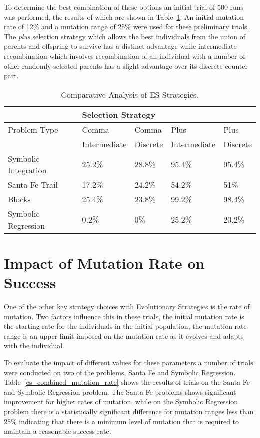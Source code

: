 To determine the best combination of these options an initial trial of 500 runs was performed, the results of which are shown in Table~\ref{es_strategies}. An initial mutation rate of 12\% and a mutation range of 25\% were used for these preliminary trials. The \emph{plus} selection strategy which allows the best individuals from the union of parents and offspring to survive has a distinct advantage while intermediate recombination which involves recombination of an individual with a number of other randomly selected parents has a slight advantage over its discrete counter part. 



\begin{table}[h]
\begin{center}
\begin{tabular}{|l|l|l|l|l|}
\hline
&\multicolumn{4}{|l|}{Selection Strategy}\\
\hline
Problem Type  & Comma         &  Comma     & Plus         & Plus \\
              & Intermediate  &  Discrete  & Intermediate &  Discrete \\
\hline
Symbolic Integration  & 25.2\% & 28.8\% & 95.4\% & 95.4\% \\
Santa Fe Trail & 17.2\% & 24.2\% & 54.2\% & 51\% \\
Blocks & 25.4\% & 23.8\% & 99.2\% & 98.4\% \\
Symbolic Regression  & 0.2\% & 0\% & 25.2\% & 20.2\% \\
\hline
\end{tabular}
\caption{\label{es_strategies} Comparative Analysis of ES Strategies.}
\end{center}
\end{table}



\section{Impact of Mutation Rate on Success}
One of the other key strategy choices with Evolutionary Strategies is the rate of mutation. Two factors influence this in these trials, the initial mutation rate is the starting rate for the individuals in the initial population, the mutation rate range is an upper limit imposed on the mutation rate as it evolves and adapts with the individual. 

To evaluate the impact of different values for these parameters a number of trials were conducted on two of the problems, Santa Fe and Symbolic Regression. Table~\ref{es_combined_mutation_rate} shows the results of trials on the Santa Fe and Symbolic Regression problem. The Santa Fe problems shows significant improvement for higher rates of mutation, while on the Symbolic Regression problem there is a statistically significant difference for mutation ranges less than 25\% indicating that there is a minimum level of mutation that is required to maintain a reasonable success rate.
 
